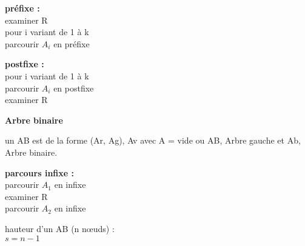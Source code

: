 \documentclass[8pt,a4paper]{extarticle}
\begin{document}
\begin{multicols}{3}
      \textbf{préfixe :}\\
      examiner R\\
      pour i variant de 1 à k\\
      \hspace*{1cm}parcourir \(A_i\) en préfixe

      \textbf{postfixe :}\\
      pour i variant de 1 à k\\
      \hspace*{1cm}parcourir \(A_i\) en postfixe\\
      examiner R

      \bigskip

      \textbf{Arbre binaire}\\

      \noindent


      un AB est de la forme (Ar, Ag), Av avec A = vide ou AB, Arbre gauche et Ab, Arbre binaire.

      \bigskip

      \textbf{parcours infixe :}\\
      parcourir \(A_1\) en infixe\\
      examiner R\\
      parcourir \(A_2\) en infixe

      \bigskip

      hauteur d'un AB (n nœuds) :\\
      \(s = n - 1\)

      \bigskip


\end{multicols}
\end{document}
